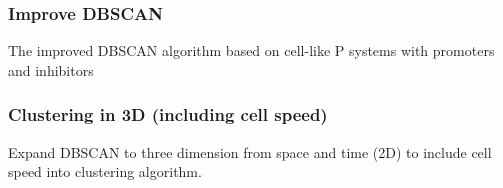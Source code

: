 \documentclass[a4paper,headsepline,footsepline,fontsize=11pt,BCOR=12mm,DIV=12]{report}
\begin{document}
\subsubsection{Improve DBSCAN}
The improved DBSCAN algorithm based on cell-like P systems with promoters and inhibitors

\subsubsection{Clustering in 3D (including cell speed)}
Expand DBSCAN to three dimension from space and time (2D) to include cell speed into clustering algorithm.



{}

\listoffigures

\listoftables

\printglossary[title=List of Acronyms, type=\acronymtype]

\printglossary[title=List of Terms]
\end{document}
